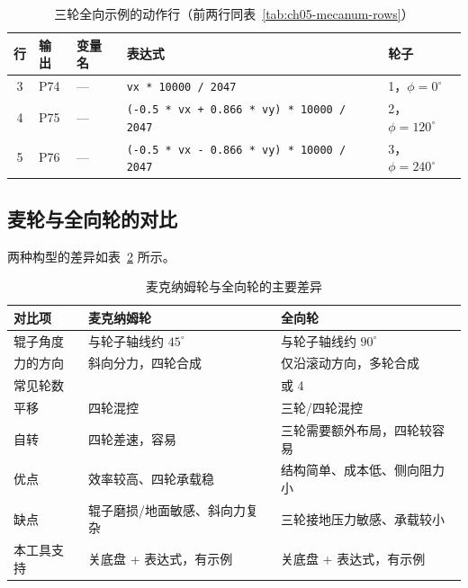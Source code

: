 \begin{table}[htbp]
  \centering
  \small
  \setlength{\tabcolsep}{4pt}
  \begin{tabularx}{\linewidth}{@{}c l l >{\raggedright\arraybackslash}X l@{}}
    \toprule
    行 & 输出 & 变量名 & 表达式 & 轮子 \\
    \midrule
    3 & P74 & — & \texttt{vx * 10000 / 2047} & 1，$\phi=0^\circ$ \\
    4 & P75 & — & \texttt{(-0.5 * vx + 0.866 * vy) * 10000 / 2047} & 2，$\phi=120^\circ$ \\
    5 & P76 & — & \texttt{(-0.5 * vx - 0.866 * vy) * 10000 / 2047} & 3，$\phi=240^\circ$ \\
    \bottomrule
  \end{tabularx}
  \caption{三轮全向示例的动作行（前两行同表~\ref{tab:ch05-mecanum-rows}）}
  \label{tab:ch05-omni-rows}
\end{table}

\subsection{麦轮与全向轮的对比}

两种构型的差异如表~\ref{tab:ch05-omni-compare} 所示。

\begin{table}[H]
  \centering
  \small
  \begin{tabularx}{\linewidth}{@{}l >{\raggedright\arraybackslash}X >{\raggedright\arraybackslash}X@{}}
    \toprule
    对比项 & 麦克纳姆轮 & 全向轮 \\
    \midrule
    辊子角度 & 与轮子轴线约 $45^\circ$ & 与轮子轴线约 $90^\circ$ \\
    力的方向 & 斜向分力，四轮合成 & 仅沿滚动方向，多轮合成 \\
    常见轮数 & 4 & 3 或 4 \\
    平移 & 四轮混控 & 三轮/四轮混控 \\
    自转 & 四轮差速，容易 & 三轮需要额外布局，四轮较容易 \\
    优点 & 效率较高、四轮承载稳 & 结构简单、成本低、侧向阻力小 \\
    缺点 & 辊子磨损/地面敏感、斜向力复杂 & 三轮接地压力敏感、承载较小 \\
    本工具支持 & 关底盘 + 表达式，有示例 & 关底盘 + 表达式，有示例 \\
    \bottomrule
  \end{tabularx}
  \caption{麦克纳姆轮与全向轮的主要差异}
  \label{tab:ch05-omni-compare}
\end{table}

